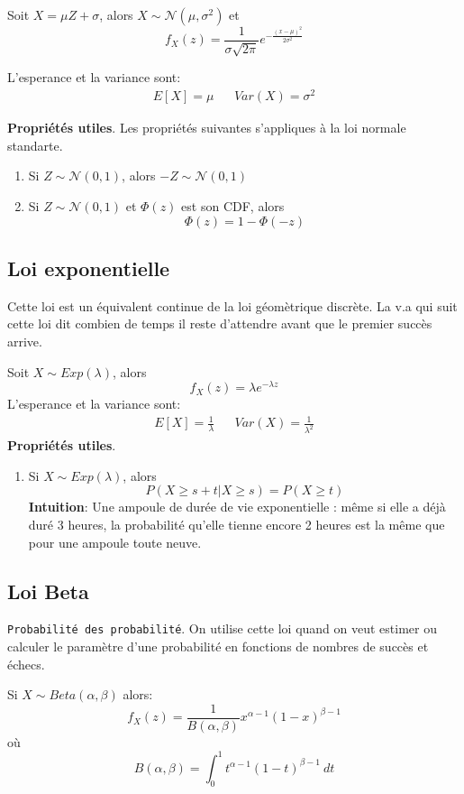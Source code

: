 \documentclass[a4paper]{article}
\begin{document}
Soit $X = \mu Z + \sigma$, alors  $X \sim \mathcal{N}(\mu, \sigma^2)$ et 
 \[
     f_X(z) = \frac{1}{\sigma \sqrt{2 \pi} }e^{- \frac{(x - \mu)^2}{2\sigma^2}}
\] 

L'esperance et la variance sont:
\begin{align*}
    E[X] = \mu & & Var(X) = \sigma^2
\end{align*}

\textbf{Propriétés utiles}.
Les propriétés suivantes s'appliques à la loi normale standarte.
\begin{enumerate}
    \item Si $Z \sim \mathcal{N}(0, 1)$, alors  $-Z \sim \mathcal{N}(0, 1)$ 
    \item Si $Z \sim \mathcal{N}(0, 1)$ et  $\Phi(z)$ est son CDF, alors
         \[
        \Phi(z) = 1 - \Phi(-z)
        \] 
\end{enumerate}

\subsection{Loi exponentielle}
Cette loi est un équivalent continue de la loi géomètrique discrète.
La v.a qui suit cette loi dit combien de temps il reste d'attendre avant que le
premier succès arrive.

Soit $X \sim Exp(\lambda)$, alors
 \[
     f_X(z) = \lambda e^{-\lambda z}
\] 
L'esperance et la variance sont:
\begin{align*}
    E[X] = \frac{1}{\lambda} & & Var(X) = \frac{1}{\lambda^2}
\end{align*}
\textbf{Propriétés utiles}.
\begin{enumerate}
    \item Si $X \sim Exp(\lambda)$, alors
         \[
        P(X \ge s + t | X \ge s) = P(X \ge t)
        \] 
        \textbf{Intuition}: Une ampoule de durée de vie exponentielle :
        même si elle a déjà duré 3 heures, la probabilité qu’elle tienne
        encore 2 heures est la même que pour une ampoule toute neuve.
\end{enumerate}

\subsection{Loi Beta}
\texttt{Probabilité des probabilité}. On utilise cette loi quand on veut
estimer ou calculer le paramètre d'une probabilité en fonctions de nombres de
succès et échecs.

Si $X \sim Beta(\alpha, \beta)$ alors:
\[
    f_X(z) = \frac{1}{B(\alpha, \beta)}x^{\alpha-1}(1 - x)^{\beta - 1}
\] 
où
\[
    B(\alpha, \beta) = \int_{{0}}^{{1}} {t^{\alpha-1} (1-t)^{\beta - 1}} \: d{t} {}
\] 
\end{document}
